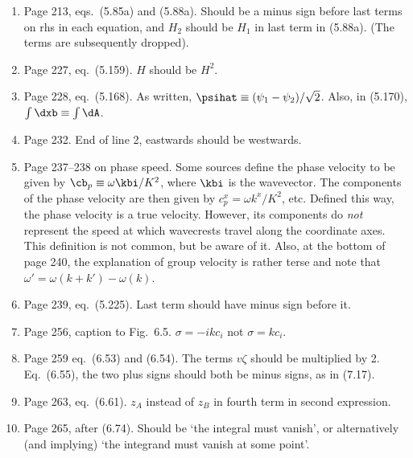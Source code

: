 \documentclass[10pt]{article}
\newcommand{\eq}{eq.\ } \newcommand{\Eq}{Eq.\ }
\begin{document}
\begin{enumerate}
\item Page 213, eqs.\ (5.85a) and (5.88a). Should be a minus sign before last terms on rhs in each equation, and $H_2$ should be $H_1$ in last term in (5.88a). (The terms are subsequently dropped).  

\item Page 227, \eq (5.159). $H$ should be $H^2$.

\item Page 228, \eq (5.168). As written, $\psihat \equiv (\psi_1 -\psi_2)/\sqrt 2$. Also, in (5.170), $\int \dxb \equiv \int \dA$. 

\item Page 232. End of line 2, eastwards should be westwards.

\item Page 237--238 on phase speed. Some sources define the phase
velocity to be given by $\cb_p \equiv \omega \kbi / K^2$, where $\kbi$
is the wavevector. The components of the phase velocity are then given
by $c^x_p = \omega k^x/K^2$, etc. Defined this way, the phase velocity
is a true velocity. However, its components do \emph{not} represent the
speed at which wavecrests travel along the coordinate axes. This
definition is not common, but be aware of it. Also, at the bottom of
page 240, the explanation of group velocity is rather terse and note
that ${\omega'} = \omega(k+k') - \omega(k)$.

\item Page 239, \eq (5.225). Last term should have minus sign before it.


\item Page 256, caption to Fig.\ 6.5. $\sigma = -i k c_i$ not $\sigma = kc_i$.


\item Page 259 \eq (6.53) and (6.54). The terms $v \zeta$ should be multiplied by 2. \\ Eq.\ (6.55), the two plus signs should both be minus signs, as in (7.17).


\item Page 263, \eq (6.61). $z_A$ instead of $z_B$ in fourth term in second expression. 

\item Page 265, after (6.74). Should be `the integral must vanish', or alternatively (and implying) `the integrand must vanish at some point'. 


\end{enumerate}
\end{document}
